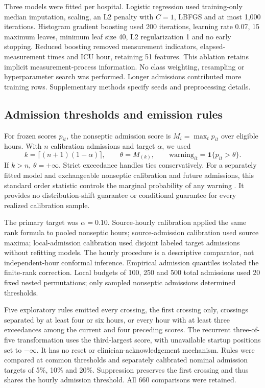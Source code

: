\documentclass[preprint,12pt]{elsarticle}
\begin{document}
Three models were fitted per hospital. Logistic regression used training-only median imputation, scaling, an L2 penalty with $C=1$, LBFGS and at most 1,000 iterations. Histogram gradient boosting used 200 iterations, learning rate 0.07, 15 maximum leaves, minimum leaf size 40, L2 regularization 1 and no early stopping. Reduced boosting removed measurement indicators, elapsed-measurement times and ICU hour, retaining 51 features. This ablation retains implicit measurement-process information. No class weighting, resampling or hyperparameter search was performed. Longer admissions contributed more training rows. Supplementary methods specify seeds and preprocessing details.

\subsection{Admission thresholds and emission rules}
For frozen scores $p_{it}$, the nonseptic admission score is $M_i=\max_t p_{it}$ over eligible hours. With $n$ calibration admissions and target $\alpha$, we used
\begin{equation}
 k=\lceil(n+1)(1-\alpha)\rceil,\qquad
 \theta=M_{(k)},\qquad \mathrm{warning}_{it}=\mathbf{1}\{p_{it}>\theta\}.
\end{equation}
If $k>n$, $\theta=+\infty$. Strict exceedance handles ties conservatively. For a separately fitted model and exchangeable nonseptic calibration and future admissions, this standard order statistic controls the marginal probability of any warning \cite{angelopoulos}. It provides no distribution-shift guarantee or conditional guarantee for every realized calibration sample.

The primary target was $\alpha=0.10$. Source-hourly calibration applied the same rank formula to pooled nonseptic hours; source-admission calibration used source maxima; local-admission calibration used disjoint labeled target admissions without refitting models. The hourly procedure is a descriptive comparator, not independent-hour conformal inference. Empirical admission quantiles isolated the finite-rank correction. Local budgets of 100, 250 and 500 total admissions used 20 fixed nested permutations; only sampled nonseptic admissions determined thresholds.

Five exploratory rules emitted every crossing, the first crossing only, crossings separated by at least four or six hours, or every hour with at least three exceedances among the current and four preceding scores. The recurrent three-of-five transformation uses the third-largest score, with unavailable startup positions set to $-\infty$. It has no reset or clinician-acknowledgement mechanism. Rules were compared at common thresholds and separately calibrated nominal admission targets of 5\%, 10\% and 20\%. Suppression preserves the first crossing and thus shares the hourly admission threshold. All 660 comparisons were retained.
\end{document}

